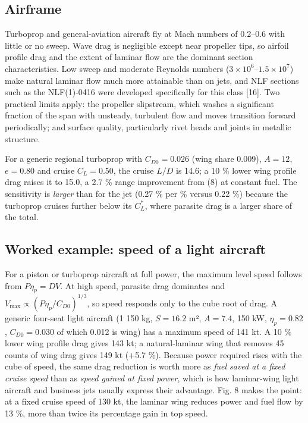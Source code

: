 \documentclass[10pt,a4paper,twocolumn]{article}
\begin{document}
\hypertarget{airframe}{%
\subsection{Airframe}\label{airframe}}

Turboprop and general-aviation aircraft fly at Mach numbers of 0.2--0.6
with little or no sweep. Wave drag is negligible except near propeller
tips, so airfoil profile drag and the extent of laminar flow are the
dominant section characteristics. Low sweep and moderate Reynolds
numbers (\(3\times10^6\)--\(1.5\times10^7\)) make natural laminar flow
much more attainable than on jets, and NLF sections such as the
NLF(1)-0416 were developed specifically for this class {[}16{]}. Two
practical limits apply: the propeller slipstream, which washes a
significant fraction of the span with unsteady, turbulent flow and moves
transition forward periodically; and surface quality, particularly rivet
heads and joints in metallic structure.

For a generic regional turboprop with \(C_{D0}=0.026\) (wing share
0.009), \(A=12\), \(e=0.80\) and cruise \(C_L=0.50\), the cruise \(L/D\)
is 14.6; a 10 \% lower wing profile drag raises it to 15.0, a 2.7 \%
range improvement from (8) at constant fuel. The sensitivity is
\emph{larger} than for the jet (0.27 \% per \% versus 0.22 \%) because
the turboprop cruises further below its \(C_L^*\), where parasite drag
is a larger share of the total.

\hypertarget{worked-example-speed-of-a-light-aircraft}{%
\subsection{Worked example: speed of a light
aircraft}\label{worked-example-speed-of-a-light-aircraft}}

For a piston or turboprop aircraft at full power, the maximum level
speed follows from \(P\eta_p = DV\). At high speed, parasite drag
dominates and \(V_{\max}\propto(P\eta_p/C_{D0})^{1/3}\), so speed
responds only to the cube root of drag. A generic four-seat light
aircraft (1 150 kg, \(S=16.2\) m², \(A=7.4\), 150 kW, \(\eta_p=0.82\),
\(C_{D0}=0.030\) of which 0.012 is wing) has a maximum speed of 141 kt.
A 10 \% lower wing profile drag gives 143 kt; a natural-laminar wing
that removes 45 counts of wing drag gives 149 kt (+5.7 \%). Because
power required rises with the cube of speed, the same drag reduction is
worth more as \emph{fuel saved at a fixed cruise speed} than as
\emph{speed gained at fixed power}, which is how laminar-wing light
aircraft and business jets usually express their advantage. Fig. 8 makes
the point: at a fixed cruise speed of 130 kt, the laminar wing reduces
power and fuel flow by 13 \%, more than twice its percentage gain in top
speed.
\end{document}
